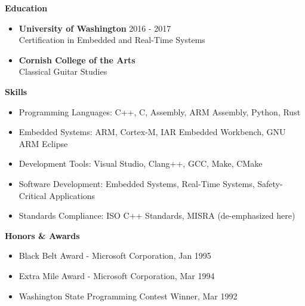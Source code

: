 \documentclass[a4paper,10pt]{article}
\begin{document}
\textbf{Education} \\
\begin{itemize}[leftmargin=0.5cm]
    \item \textbf{University of Washington} \hfill 2016 - 2017 \\
    Certification in Embedded and Real-Time Systems
    
    \item \textbf{Cornish College of the Arts} \\
    Classical Guitar Studies
\end{itemize}

\textbf{Skills} \\
\begin{itemize}[leftmargin=0.5cm]
    \item Programming Languages: C++, C, Assembly, ARM Assembly, Python, Rust
    \item Embedded Systems: ARM, Cortex-M, IAR Embedded Workbench, GNU ARM Eclipse
    \item Development Tools: Visual Studio, Clang++, GCC, Make, CMake
    \item Software Development: Embedded Systems, Real-Time Systems, Safety-Critical Applications
    \item Standards Compliance: ISO C++ Standards, MISRA (de-emphasized here)
\end{itemize}

\textbf{Honors \& Awards} \\
\begin{itemize}[leftmargin=0.5cm]
    \item Black Belt Award - Microsoft Corporation, Jan 1995
    \item Extra Mile Award - Microsoft Corporation, Mar 1994
    \item Washington State Programming Contest Winner, Mar 1992
\end{itemize}
\end{document}
